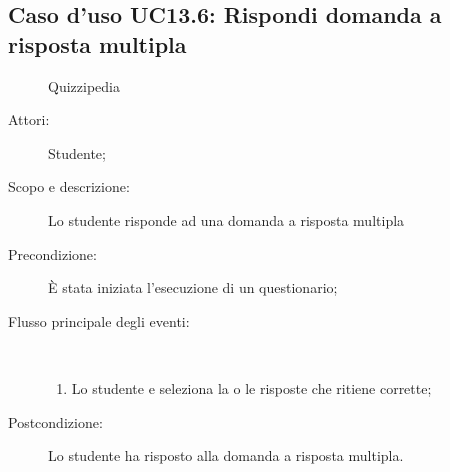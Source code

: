 \subsection{Caso d'uso UC13.6: Rispondi domanda a risposta multipla}
	\begin{figure}[H]
		\centering
		\begin{resizedtikzpicture}{\textwidth}
		\begin{umlsystem}[x=0, fill=lightgray!20]{Quizzipedia}
		\end{umlsystem}
		\end{resizedtikzpicture}
		\caption{}
	\end{figure}
\begin{description}
\item[Attori:] Studente;
\item[Scopo e descrizione:] Lo studente risponde ad una domanda a risposta multipla
      \item[Precondizione:] È stata iniziata l'esecuzione di un questionario;

        \item[Flusso principale degli eventi:] \ 
 \begin{enumerate}
          \item Lo studente e seleziona la o le risposte che ritiene corrette;

      \end{enumerate}
    \item[Postcondizione:] Lo studente ha risposto alla domanda a risposta multipla.
  \end{description}
\hypertarget{UC13.7}{}
